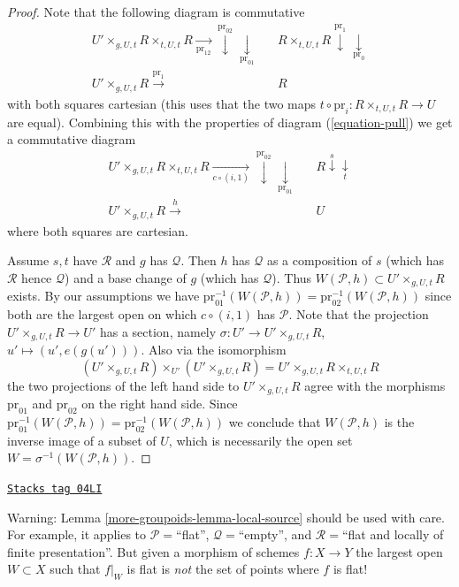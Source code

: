 \begin{proof}
Note that the following diagram is commutative
$$
\begin{array}{ccc}U' \times_{g, U, t} R \times_{t, U, t} R
\underset{\text{pr}_{12}}{\longrightarrow}\overset{\text{pr}_{02}}{\downarrow}\underset{\text{pr}_{01}}{\downarrow} &  & R \times_{t, U, t} R
\overset{\text{pr}_1}{\downarrow}\underset{\text{pr}_0}{\downarrow} \\ U' \times_{g, U, t} R \overset{\text{pr}_1}{\longrightarrow} &  & R\end{array}
$$
with both squares cartesian (this uses that the two maps
$t \circ \text{pr}_i : R \times_{t, U, t} R \to U$ are equal).
Combining this with the properties of diagram (\ref{equation-pull})
we get a commutative diagram
$$
\begin{array}{ccc}U' \times_{g, U, t} R \times_{t, U, t} R
\underset{c \circ (i, 1)}{\longrightarrow}\overset{\text{pr}_{02}}{\downarrow}\underset{\text{pr}_{01}}{\downarrow} &  & R
\overset{s}{\downarrow}\underset{t}{\downarrow} \\ U' \times_{g, U, t} R \overset{h}{\longrightarrow} &  & U\end{array}
$$
where both squares are cartesian.

\medskip\noindent
Assume $s, t$ have $\mathcal{R}$ and $g$ has $\mathcal{Q}$.
Then $h$ has $\mathcal{Q}$ as a composition of $s$ (which has
$\mathcal{R}$ hence $\mathcal{Q}$) and a base change of $g$ (which
has $\mathcal{Q}$). Thus $W(\mathcal{P}, h) \subset U' \times_{g, U, t} R$
exists. By our assumptions we have
$\text{pr}_{01}^{-1}(W(\mathcal{P}, h)) =
\text{pr}_{02}^{-1}(W(\mathcal{P}, h))$
since both are the largest open on which $c \circ (i, 1)$ has $\mathcal{P}$.
Note that the projection $U' \times_{g, U, t} R \to U'$ has a section, namely
$\sigma : U' \to U' \times_{g, U, t} R$, $u' \mapsto (u', e(g(u')))$.
Also via the isomorphism
$$
(U' \times_{g, U, t} R) \times_{U'} (U' \times_{g, U, t} R)
=
U' \times_{g, U, t} R \times_{t, U, t} R
$$
the two projections of the left hand side
to $U' \times_{g, U, t} R$ agree with the morphisms $\text{pr}_{01}$
and $\text{pr}_{02}$ on the right hand side. Since
$\text{pr}_{01}^{-1}(W(\mathcal{P}, h)) =
\text{pr}_{02}^{-1}(W(\mathcal{P}, h))$
we conclude that $W(\mathcal{P}, h)$ is the inverse image of a subset of $U$,
which is necessarily the open set
$W = \sigma^{-1}(W(\mathcal{P}, h))$.
\end{proof}

\begin{remark}
\label{more-groupoids-remark-local-source-warning}
\href{https://stacks.math.columbia.edu/tag/04LI}{\texttt{Stacks tag 04LI}}

Warning:
Lemma \ref{more-groupoids-lemma-local-source}
should be used with care.
For example, it applies to $\mathcal{P}=$``flat'', $\mathcal{Q}=$``empty'',
and $\mathcal{R}=$``flat and locally of finite presentation''. But given a
morphism of schemes $f : X \to Y$ the largest open $W \subset X$ such that
$f|_W$ is flat is {\it not} the set of points where $f$ is flat!
\end{remark}

